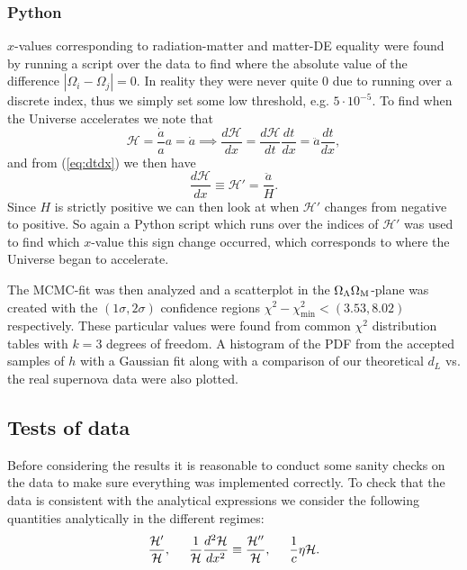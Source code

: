 \documentclass[%
reprint,
 amsmath,amssymb,
 aps,
]{revtex4-2}
\newcommand{\Hp}{\mathcal{H}}
\begin{document}
\subsubsection{Python}
$x$-values corresponding to radiation-matter and matter-DE equality were found by running a script over the data to find where the absolute value of the difference $|\Omega_i-\Omega_j|=0$. In reality they were never quite 0 due to running over a discrete index, thus we simply set some low threshold, e.g. $5\cdot10^{-5}$. To find when the Universe accelerates we note that
\[\Hp=\frac{\dot a}{a}a=\dot a\implies \frac{d\Hp}{dx}=\frac{d\Hp}{dt}\frac{dt}{dx}=\ddot{a}\frac{dt}{dx},\]
and from (\ref{eq:dtdx}) we then have
\[\frac{d\Hp}{dx}\equiv\Hp'=\frac{\ddot a}{H}.\]
Since $H$ is strictly positive we can then look at when $\Hp'$ changes from negative to positive. So again a Python script which runs over the indices of $\Hp'$ was used to find which $x$-value this sign change occurred, which corresponds to where the Universe began to accelerate. 

The MCMC-fit was then analyzed and a scatterplot in the $\Omega_\Lambda\Omega_\text M$-plane was created with the $(1\sigma,2\sigma)$ confidence regions $\chi^2-\chi^2_\text{min}<(3.53,8.02)$ respectively. These particular values were found from common $\chi^2$ distribution tables with $k=3$ degrees of freedom. A histogram of the PDF  from the accepted samples of $h$ with a Gaussian fit along with a comparison of our theoretical $d_L$ vs. the real supernova data were also plotted.

\subsection{Tests of data}

Before considering the results it is reasonable to conduct some sanity checks on the data to make sure everything was implemented correctly. To check that the data is consistent with the analytical expressions we consider the following quantities analytically in the different regimes:
\[\frac{\Hp'}{\Hp},\hspace{5mm}\frac{1}{\Hp}\frac{d^2\Hp}{dx^2}\equiv\frac{\Hp''}{\Hp},\hspace{5mm}\frac{1}{c}\eta\Hp.\]
\end{document}
